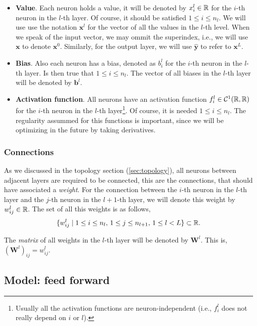 \begin{itemize}
  \item \textbf{Value}. Each neuron holds a value, it will be denoted by
  \(x_i^l \in \mathbb{R}\) for the \(i\)-th neuron in the \(l\)-th layer. Of course, it
  should be satisfied \(1 \leq i \leq n_l\). We will use use the notation
  \(\mathbf{x}^l\) for the vector of all the values in the \(l\)-th level. When
  we speak of the input vector, we may ommit the superindex, i.e., we will use
  \(\mathbf{x}\) to denote \(\mathbf{x}^0\). Similarly, for the output layer,
  we will use \(\mathbf{\hat{y}}\) to refer to \(\mathbf{x}^L\).
  \item \textbf{Bias}. Also each neuron has a bias, denoted as \(b_i^l\) for
  the \(i\)-th neuron in the \(l\)-th layer. Is then true that
  \(1 \leq i \leq n_l\). The vector of all biases in the \(l\)-th layer will be
  denoted by \(\mathbf{b}^l\).
  \item \textbf{Activation function}. All neurons have an activation function
  \(f_i^l \in \mathcal{C}^1(\mathbb{R}, \mathbb{R})\) for the \(i\)-th neuron in the \(l\)-th
  layer\footnote{Usually all the activation functions are neuron-independent
    (i.e., \(f_i^l\) does not really depend on \(i\) or \(l\)).}. Of course, it
  is needed \(1 \leq i \leq n_l\). The regularity assummed for this functions
  is important, since we will be optimizing in the future by taking
  derivatives.
\end{itemize}

\subsubsection{Connections}
As we discussed in the topology section (\ref{sec:topology}), all neurons
between adjacent layers are required to be connected, this are the connections,
that should have associated a \emph{weight}. For the connection between the
\(i\)-th neuron in the \(l\)-th layer and the \(j\)-th neuron in the
\(l + 1\)-th layer, we will denote this weight by \(w_{ij}^l \in \mathbb{R}\). The set of
all this weights is as follows,
\begin{equation}
   \{w_{ij}^l \mid 1 \leq i \leq n_{l}, \, 1 \leq j \leq n_{l+1}, \, 1 \leq l <
   L \} \subset \mathbb{R}.
 \end{equation}

The \emph{matrix} of all weights in the \(l\)-th layer will be denoted by
\(\mathbf{W}^l\). This is, \((\mathbf{W}^l)_{ij} = w_{ij}^l\).

\subsection{Model: feed forward}
\label{subsec:forward}

